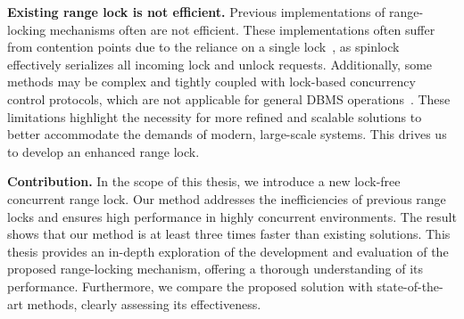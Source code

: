 \textbf{Existing range lock is not efficient.}
Previous implementations of range-locking mechanisms often are not efficient. 
These implementations often suffer from contention points due to the reliance on a single lock~\parencite{linuxRangeLockImpl2013, song2013parallelizing}, as spinlock effectively serializes all incoming lock and unlock requests. 
Additionally, some methods may be complex and tightly coupled with lock-based concurrency control protocols, which are not applicable for general DBMS operations~\parencite{graefe2007hierarchical, andy2022database}. 
These limitations highlight the necessity for more refined and scalable solutions to better accommodate the demands of modern, large-scale systems. This drives us to develop an enhanced range lock.

\textbf{Contribution.} In the scope of this thesis, we introduce a new lock-free concurrent range lock. 
Our method addresses the inefficiencies of previous range locks and ensures high performance in highly concurrent environments. 
The result shows that our method is at least three times faster than existing solutions. 
This thesis provides an in-depth exploration of the development and evaluation of the proposed range-locking mechanism, offering a thorough understanding of its performance. 
Furthermore, we compare the proposed solution with state-of-the-art methods, clearly assessing its effectiveness.